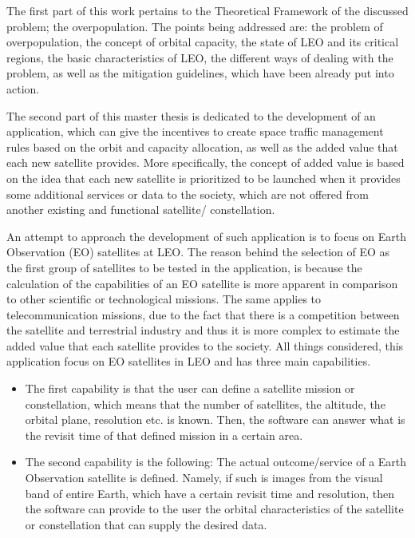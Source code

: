 
The first part of this work pertains to the Theoretical Framework of the discussed problem; the overpopulation. The points being addressed are: the problem of overpopulation, the concept of orbital capacity, the state of LEO and its critical regions, the basic characteristics of LEO, the different ways of dealing with the problem, as well as the mitigation guidelines, which have been already put into action.

The second part of this master thesis is dedicated to the development of an application, which can give the incentives to create space traffic management rules based on the orbit and capacity allocation, as well as the added value that each new satellite provides. More specifically, the concept of added value is based on the idea that each new satellite is prioritized to be launched when it provides some additional services or data to the society, which are not offered from another existing and functional satellite/ constellation.

An attempt to approach the development of such application is to focus on Earth Observation (EO) satellites at LEO. The reason behind the selection of EO as the first group of satellites to be tested in the application, is because the calculation of the capabilities of an EO satellite is more apparent in comparison to other scientific or technological missions. The same applies to telecommunication missions, due to the fact that there is a competition between the satellite and terrestrial industry and thus it is more complex to estimate the added value that each satellite provides to the society. All things considered, this application focus on EO satellites in LEO and has three main capabilities.

\begin{itemize}
\item The first capability is that the user can define a satellite mission or constellation, which means that the number of satellites, the altitude, the orbital plane, resolution etc. is known. Then, the software can answer what is the revisit time of that defined mission in a certain area.
\item The second capability is the following: The actual outcome/service of a Earth Observation satellite is defined. Namely, if such is images from the visual band of entire Earth, which have a certain revisit time and resolution, then the software can provide to the user the orbital characteristics of the satellite or constellation that can supply the desired data.
\end{itemize}

